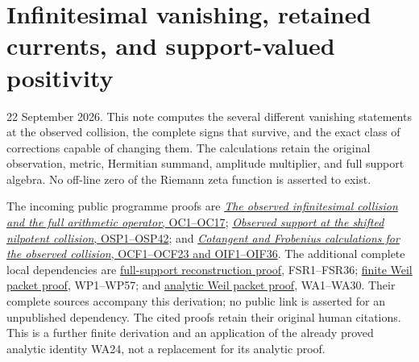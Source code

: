 \documentclass[
  10pt,
  a4paper,
]{article}
\author{}
\date{}
\begin{document}
{
\setcounter{tocdepth}{3}
\tableofcontents
}
\section{Infinitesimal vanishing, retained currents, and support-valued
positivity}\label{infinitesimal-vanishing-retained-currents-and-support-valued-positivity}

22 September 2026. This note computes the several different vanishing
statements at the observed collision, the complete signs that survive,
and the exact class of corrections capable of changing them. The
calculations retain the original observation, metric, Hermitian summand,
amplitude multiplier, and full support algebra. No off-line zero of the
Riemann zeta function is asserted to exist.

The incoming public programme proofs are
\href{https://github.com/KokunoYumeto/zeta-function-research-reader/blob/c9df443d9e1df000dfbb083943f97197e746eb08/workbenches/splitzero-tandem/branches/identity-absorber-square/OBSERVED_COLLISION.md}{\emph{The
observed infinitesimal collision and the full arithmetic operator},
OC1--OC17};
\href{https://github.com/KokunoYumeto/zeta-function-research-reader/blob/c9df443d9e1df000dfbb083943f97197e746eb08/workbenches/splitzero-tandem/branches/identity-absorber-square/OBSERVED_SUPPORT_PROPAGATION.md}{\emph{Observed
support at the shifted nilpotent collision}, OSP1--OSP42}; and
\href{https://github.com/KokunoYumeto/zeta-function-research-reader/blob/c9df443d9e1df000dfbb083943f97197e746eb08/workbenches/splitzero-tandem/branches/identity-absorber-square/OBSERVED_COTANGENT_FROBENIUS.md}{\emph{Cotangent
and Frobenius calculations for the observed collision}, OCF1--OCF23 and
OIF1--OIF36}. The additional complete local dependencies are
\href{https://github.com/KokunoYumeto/zeta-function-research-reader/blob/173dbc6ed5a03235dbe7654f928f3692107db39b/workbenches/splitzero-tandem/branches/tau-zero-prime-positivity/FULL_SUPPORT_RECONSTRUCTION_DERIVATION.md}{full-support
reconstruction proof}, FSR1--FSR36;
\href{https://github.com/KokunoYumeto/zeta-function-research-reader/blob/173dbc6ed5a03235dbe7654f928f3692107db39b/workbenches/splitzero-tandem/branches/tau-zero-prime-positivity/WEIL_PACKET_DERIVATION.md}{finite
Weil packet proof}, WP1--WP57; and
\href{https://github.com/KokunoYumeto/zeta-function-research-reader/blob/173dbc6ed5a03235dbe7654f928f3692107db39b/workbenches/splitzero-tandem/branches/tau-zero-prime-positivity/WEIL_PACKET_ANALYTIC_DERIVATION.md}{analytic
Weil packet proof}, WA1--WA30. Their complete sources accompany this
derivation; no public link is asserted for an unpublished dependency.
The cited proofs retain their original human citations. This is a
further finite derivation and an application of the already proved
analytic identity WA24, not a replacement for its analytic proof.
\end{document}
